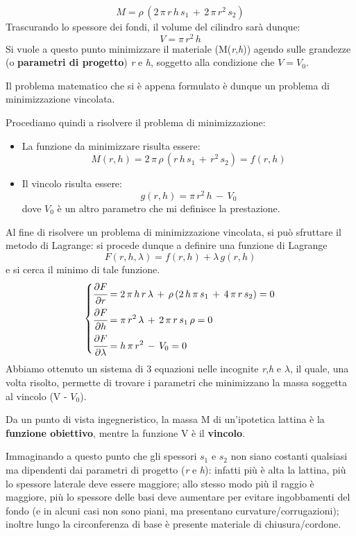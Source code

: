\[M = \rho\,(2\,\pi\,r\,h\,s_1\,+\,2\,\pi\,r^2\,s_2)\]
Trascurando lo spessore dei fondi, il volume del cilindro sarà dunque:
\[V = \pi\,r^2\,h\]
Si vuole a questo punto minimizzare il materiale (M(\emph{r},\emph{h})) agendo sulle grandezze (o \textbf{parametri di progetto}) \emph{r} e \emph{h}, soggetto alla condizione che $V = V_0$.

Il problema matematico che si è appena formulato è dunque un problema di minimizzazione vincolata.

Procediamo quindi a risolvere il problema di minimizzazione:
\begin{itemize}
\item La funzione da minimizzare risulta essere:
\[M(r,h) = 2\,\pi\,\rho\,(r\,h\,s_1\,+\,r^2\,s_2) = f(r,h)\]
\item  Il vincolo risulta essere:
\[g(r,h) = \pi\,r^2\,h\,-\,V_0\]
dove $V_0$ è un altro parametro	 che mi definisce la prestazione.
\end{itemize}

Al fine di risolvere un problema di minimizzazione vincolata, si può sfruttare il metodo di Lagrange: si procede dunque a definire una funzione di Lagrange
\[F(r,h, \lambda) = f(r, h) + \lambda\,g(r,h)\]
e si cerca il minimo di tale funzione.
\[
\begin{dcases}
\cfrac{\partial F}{\partial r} = 2\,\pi\,h\,r\,\lambda\,+\,\rho\,(2\,h\,\pi\,s_1\,+\,4\,\pi\,r\,s_2) = 0\\
\cfrac{\partial F}{\partial h} = \pi\,r^2\,\lambda\,+\,2\,\pi\,r\,s_1\,\rho = 0\\
\cfrac{\partial F}{\partial\lambda} = h\,\pi\,r^2\,-\,V_0 = 0
\end{dcases}
\]
Abbiamo ottenuto un sistema di 3 equazioni nelle incognite \emph{r},\emph{h} e $\lambda$, il quale, una volta risolto, permette di trovare i parametri che minimizzano la massa soggetta al vincolo (V - $V_ 0$).

Da un punto di vista ingegneristico, la massa M di un'ipotetica lattina è la \textbf{funzione obiettivo}, mentre la funzione V è il \textbf{vincolo}.

Immaginando a questo punto che gli spessori $s_1$ e $s_2$ non siano costanti qualsiasi ma dipendenti dai parametri di progetto (\emph{r} e \emph{h}): infatti più è alta la lattina, più lo spessore laterale deve essere maggiore; allo stesso modo più il raggio è maggiore, più lo spessore delle basi deve aumentare per evitare ingobbamenti del fondo (e in alcuni casi non sono piani, ma presentano curvature/corrugazioni); inoltre lungo la circonferenza di base è presente materiale di chiusura/cordone.

